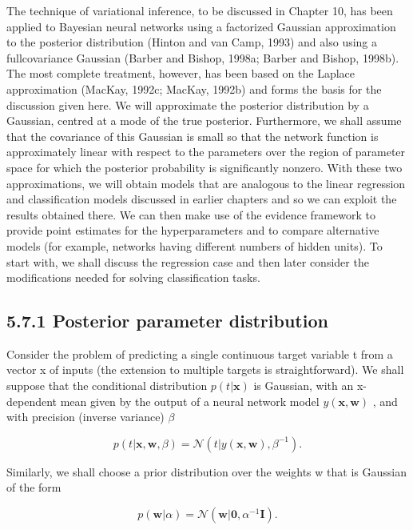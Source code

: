 \documentclass[
  10
]{article}
\begin{document}
The technique of variational inference, to be discussed in Chapter 10,
has been applied to Bayesian neural networks using a factorized Gaussian
approximation to the posterior distribution (Hinton and van Camp, 1993)
and also using a fullcovariance Gaussian (Barber and Bishop, 1998a;
Barber and Bishop, 1998b). The most complete treatment, however, has
been based on the Laplace approximation (MacKay, 1992c; MacKay, 1992b)
and forms the basis for the discussion given here. We will approximate
the posterior distribution by a Gaussian, centred at a mode of the true
posterior. Furthermore, we shall assume that the covariance of this
Gaussian is small so that the network function is approximately linear
with respect to the parameters over the region of parameter space for
which the posterior probability is significantly nonzero. With these two
approximations, we will obtain models that are analogous to the linear
regression and classification models discussed in earlier chapters and
so we can exploit the results obtained there. We can then make use of
the evidence framework to provide point estimates for the
hyperparameters and to compare alternative models (for example, networks
having different numbers of hidden units). To start with, we shall
discuss the regression case and then later consider the modifications
needed for solving classification tasks.

\subsection{5.7.1 Posterior parameter
distribution}\label{posterior-parameter-distribution}

Consider the problem of predicting a single continuous target variable t
from a vector x of inputs (the extension to multiple targets is
straightforward). We shall suppose that the conditional distribution
\(p ( t | \mathbf { x } )\) is Gaussian, with an x-dependent mean given
by the output of a neural network model
\(y ( \mathbf { x } , \mathbf { w } )\) , and with precision (inverse
variance) \(\beta\)

\[
p (t | \mathbf {x}, \mathbf {w}, \beta) = \mathcal {N} (t | y (\mathbf {x}, \mathbf {w}), \beta^ {- 1}).\tag{5.161}
\]

Similarly, we shall choose a prior distribution over the weights w that
is Gaussian of the form

\[
p (\mathbf {w} | \alpha) = \mathcal {N} (\mathbf {w} | \mathbf {0}, \alpha^ {- 1} \mathbf {I}).\tag{5.162}
\]
\end{document}
